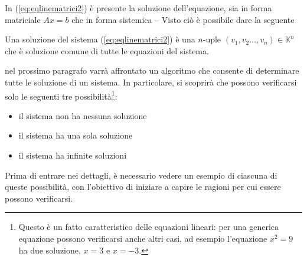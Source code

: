 In (\ref{eq:eqlinematrici2}) è presente la soluzione dell'equazione,
sia in forma matriciale $Ax=b$ che in forma sistemica -- Visto ciò è
possibile dare la seguente
\begin{defi}
  \label{defi:eqlinematrici2}
  Una soluzione del sistema (\ref{eq:eqlinematrici2}) è una $n$-uple
  $(v_1,v_2\dots,v_n) \in \mathds{K}^n$ che è soluzione comune di tutte le
  equazioni del sistema.

  nel prossimo paragrafo varrà affrontato un algoritmo che consente di
  determinare tutte le soluzione di un sistema. In particolare, si
  scoprirà che possono verificarsi solo le seguenti tre
  possibilità\footnote{Questo è un fatto caratteristico delle equazioni
    lineari: per una generica equazione possono verificarsi anche altri
    casi, ad esempio l'equazione $x^2=9$ ha due soluzione, $x=3$ e
    $x=-3$.}:
  \begin{itemize}
  \item il sistema non ha nessuna soluzione
  \item il sistema ha una sola soluzione
  \item il sistema ha infinite soluzioni
  \end{itemize}
  Prima di entrare nei dettagli, è necessario vedere un esempio di
  ciascuna di queste possibilità, con l'obiettivo di iniziare a capire le
  ragioni per cui essere possono verificarsi.


\end{defi}
